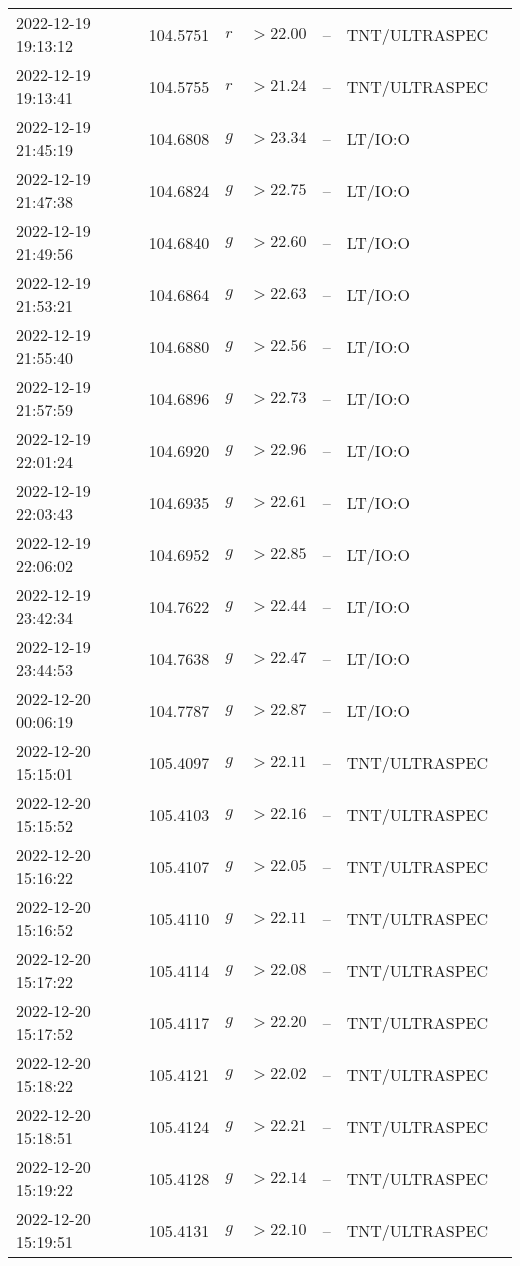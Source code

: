 \documentclass{nature_plusfigure}
\begin{document}
\begin{supplement}
\begin{center}
\begin{longtable}{lllllll}
2022-12-19 19:13:12 & 104.5751 & $r$ & $>22.00$ & -- & TNT/ULTRASPEC &  \\ 
2022-12-19 19:13:41 & 104.5755 & $r$ & $>21.24$ & -- & TNT/ULTRASPEC &  \\ 
2022-12-19 21:45:19 & 104.6808 & $g$ & $>23.34$ & -- & LT/IO:O &  \\ 
2022-12-19 21:47:38 & 104.6824 & $g$ & $>22.75$ & -- & LT/IO:O &  \\ 
2022-12-19 21:49:56 & 104.6840 & $g$ & $>22.60$ & -- & LT/IO:O &  \\ 
2022-12-19 21:53:21 & 104.6864 & $g$ & $>22.63$ & -- & LT/IO:O &  \\ 
2022-12-19 21:55:40 & 104.6880 & $g$ & $>22.56$ & -- & LT/IO:O &  \\ 
2022-12-19 21:57:59 & 104.6896 & $g$ & $>22.73$ & -- & LT/IO:O &  \\ 
2022-12-19 22:01:24 & 104.6920 & $g$ & $>22.96$ & -- & LT/IO:O &  \\ 
2022-12-19 22:03:43 & 104.6935 & $g$ & $>22.61$ & -- & LT/IO:O &  \\ 
2022-12-19 22:06:02 & 104.6952 & $g$ & $>22.85$ & -- & LT/IO:O &  \\ 
2022-12-19 23:42:34 & 104.7622 & $g$ & $>22.44$ & -- & LT/IO:O &  \\ 
2022-12-19 23:44:53 & 104.7638 & $g$ & $>22.47$ & -- & LT/IO:O &  \\ 
2022-12-20 00:06:19 & 104.7787 & $g$ & $>22.87$ & -- & LT/IO:O &  \\ 
2022-12-20 15:15:01 & 105.4097 & $g$ & $>22.11$ & -- & TNT/ULTRASPEC &  \\ 
2022-12-20 15:15:52 & 105.4103 & $g$ & $>22.16$ & -- & TNT/ULTRASPEC &  \\ 
2022-12-20 15:16:22 & 105.4107 & $g$ & $>22.05$ & -- & TNT/ULTRASPEC &  \\ 
2022-12-20 15:16:52 & 105.4110 & $g$ & $>22.11$ & -- & TNT/ULTRASPEC &  \\ 
2022-12-20 15:17:22 & 105.4114 & $g$ & $>22.08$ & -- & TNT/ULTRASPEC &  \\ 
2022-12-20 15:17:52 & 105.4117 & $g$ & $>22.20$ & -- & TNT/ULTRASPEC &  \\ 
2022-12-20 15:18:22 & 105.4121 & $g$ & $>22.02$ & -- & TNT/ULTRASPEC &  \\ 
2022-12-20 15:18:51 & 105.4124 & $g$ & $>22.21$ & -- & TNT/ULTRASPEC &  \\ 
2022-12-20 15:19:22 & 105.4128 & $g$ & $>22.14$ & -- & TNT/ULTRASPEC &  \\ 
2022-12-20 15:19:51 & 105.4131 & $g$ & $>22.10$ & -- & TNT/ULTRASPEC &  \\ 

\end{longtable}
\end{center}
\end{supplement}
\end{document}

